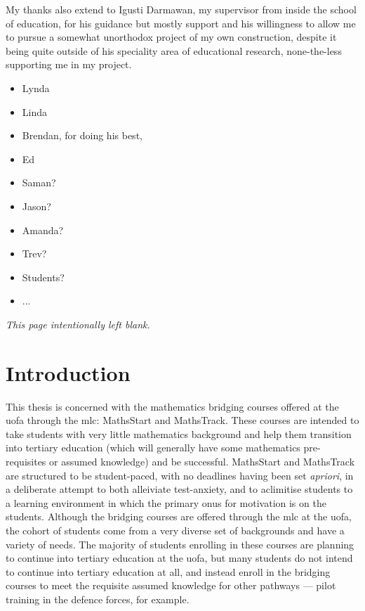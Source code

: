 \documentclass[twoside,12pt,a4paper]{report}
\makeatletter
\newcommand*{\intentionallyblankpage}{
  \vspace*{\fill}
  {\centering \textit{This page intentionally left blank.} \par}
  \vspace{\fill}}
\renewcommand*{\cleardoublepage}{\clearpage\if@twoside \ifodd\c@page\else
  \intentionallyblankpage
  \newpage
  \if@twocolumn\hbox{}\newpage\fi\fi\fi}
\makeatother
\begin{document}
My thanks also extend to Igusti Darmawan, my supervisor from inside the school of education, for his guidance but mostly support and his willingness to allow me to pursue a somewhat unorthodox project of my own construction, despite it being quite outside of his speciality area of educational research, none-the-less supporting me in my project.

\begin{itemize}
	\item Lynda 
	\item Linda
	\item Brendan, for doing his best,
	\item Ed 
	\item Saman?
	\item Jason?
	\item Amanda?
	\item Trev?
	\item Students?
	\item ...
\end{itemize}





\cleardoublepage
\chapter{Introduction}
\label{chap:intro}

\glsresetall

This thesis is concerned with the mathematics bridging courses offered at the \gls{uofa} through the \gls{mlc}: MathsStart and MathsTrack. These courses are intended to take students with very little mathematics background and help them transition into tertiary education (which will generally have some mathematics pre-requisites or assumed knowledge) and be successful. MathsStart and MathsTrack are structured to be student-paced, with no deadlines having been set \textit{apriori}, in a deliberate attempt to both alleiviate test-anxiety, and to aclimitise students to a learning environment in which the primary onus for motivation is on the students. Although the bridging courses are offered through the \gls{mlc} at the \gls{uofa}, the cohort of students come from a very diverse set of backgrounds and have a variety of needs. The majority of students enrolling in these courses are planning to continue into tertiary education at the \gls{uofa}, but many students do not intend to continue into tertiary education at all, and instead enroll in the bridging courses to meet the requisite assumed knowledge for other pathways --- pilot training in the defence forces, for example. 
\end{document}
